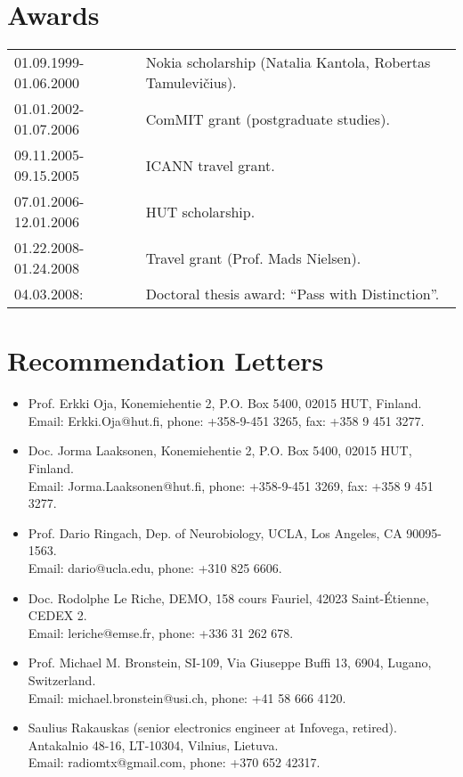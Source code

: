 \documentclass[a4paper,11pt]{article}
\begin{document}
\section{Awards}
%
\begin{tabularx}{\textwidth}{@{}p{3cm}X@{}}
        01.09.1999-01.06.2000 & Nokia scholarship (Natalia Kantola, Robertas Tamulevičius).\\
        01.01.2002-01.07.2006 & ComMIT grant (postgraduate studies).\\
        09.11.2005-09.15.2005 & ICANN travel grant.\\
        07.01.2006-12.01.2006 & HUT scholarship.\\
        01.22.2008-01.24.2008 & Travel grant (Prof. Mads Nielsen).\\
        04.03.2008: & Doctoral thesis award: “Pass with Distinction”.
\end{tabularx}
%
\section{Recommendation Letters}
%
\begin{itemize}
\item Prof. Erkki Oja, Konemiehentie 2, P.O. Box 5400, 02015 HUT, Finland. \\
Email: Erkki.Oja@hut.fi, phone: +358-9-451 3265, fax: +358 9 451 3277.
\item Doc. Jorma Laaksonen, Konemiehentie 2, P.O. Box 5400, 02015 HUT, Finland. \\
Email: Jorma.Laaksonen@hut.fi, phone: +358-9-451 3269, fax: +358 9 451 3277.
\item Prof. Dario Ringach, Dep. of Neurobiology, UCLA, Los Angeles, CA 90095-1563. \\
Email: dario@ucla.edu, phone: +310 825 6606.
\item Doc. Rodolphe Le Riche, DEMO, 158 cours Fauriel, 42023 Saint-Étienne, CEDEX 2.\\ 
Email: leriche@emse.fr, phone: +336 31 262 678.
\item Prof. Michael M. Bronstein, SI-109, Via Giuseppe Buffi 13, 6904, Lugano, Switzerland.\\
Email: michael.bronstein@usi.ch, phone: +41 58 666 4120.
\item Saulius Rakauskas (senior electronics engineer at Infovega, retired). Antakalnio 48-16, LT-10304, Vilnius, Lietuva.\\
Email: radiomtx@gmail.com, phone: +370 652 42317.
\end{itemize}
%
\end{document}
